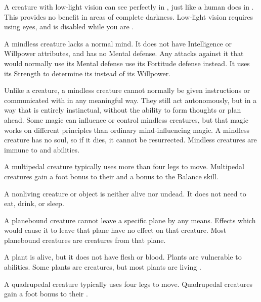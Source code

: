   A creature with low-light vision can see perfectly in , just like a human does in .
  This provides no benefit in areas of complete darkness.
  Low-light vision requires using eyes, and is disabled while you are \dazzled.

  A mindless creature lacks a normal mind.
  It does not have Intelligence or Willpower attributes, and has no Mental defense.
  Any attacks against it that would normally use its Mental defense use its Fortitude defense instead.
  It uses its Strength to determine its  instead of its Willpower.

  Unlike a  creature, a mindless creature cannot normally be given instructions or communicated with in any meaningful way.
  They still act autonomously, but in a way that is entirely instinctual, without the ability to form thoughts or plan ahead.
  Some magic can influence or control mindless creatures, but that magic works on different principles than ordinary mind-influencing magic.
  A mindless creature has no soul, so if it dies, it cannot be resurrected.
  Mindless creatures are immune to  and  abilities.

  A multipedal creature typically uses more than four legs to move.
  Multipedal creatures gain a  foot bonus to their  and a  bonus to the Balance skill.

  A nonliving creature or object is neither alive nor undead.
  It does not need to eat, drink, or sleep.

  A planebound creature cannot leave a specific plane by any means.
  Effects which would cause it to leave that plane have no effect on that creature.
  Most planebound creatures are  creatures from that plane.

  A plant is alive, but it does not have flesh or blood.
  Plants are vulnerable to \atFire abilities.
  Some plants are creatures, but most plants are living .

  A quadrupedal creature typically uses four legs to move.
  Quadrupedal creatures gain a  foot bonus to their .

